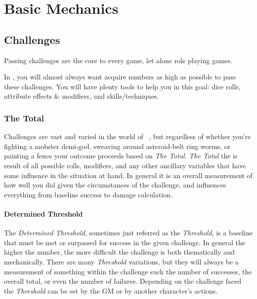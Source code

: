 \part{Basic Mechanics}\label{part:basics}
\chapter{Challenges}\label{ch:challenges}
Passing challenges are the core to every game, let alone role playing games. 

In \gametitlemini, you will almost always want acquire numbers as
high as possible to pass these challenges. You will have plenty tools
to help you in this goal: dice rolls, attribute effects \& modifiers,
and skills/techniques. 

\section{The Total}\label{sec:thetotal}
Challenges are vast and varied in the world of \gametitlemini\ , but regardless of whether you're fighting a mobster demi-god, sweaving around asteroid-belt ring worms, or painting a fence your outcome proceeds based on \emph{The Total}. \emph{The Total} the is result of all possible rolls, modifiers, and any other ancillary variables that have some influence in the situation at hand. In general it is an overall measurement of how well you did given the circumstances of the challenge, and influences everything from baseline success to damage calculation.

\subsection{Determined Threshold}\label{subsec:determined_threshold}
The \emph{Determined Threshold}, sometimes just referred as the \emph{Threshold}, is a baseline that must be met or surpassed for success in the given challenge. In general the higher the number, the more difficult the challenge is both thematically and mechanically. There are many \emph{Threshold} variations, but they will always be a measurement of something within the challenge such the number of successes, the overall total, or even the number of failures. Depending on the challenge faced the \emph{Threshold} can be set by the GM or by another character's actions.



